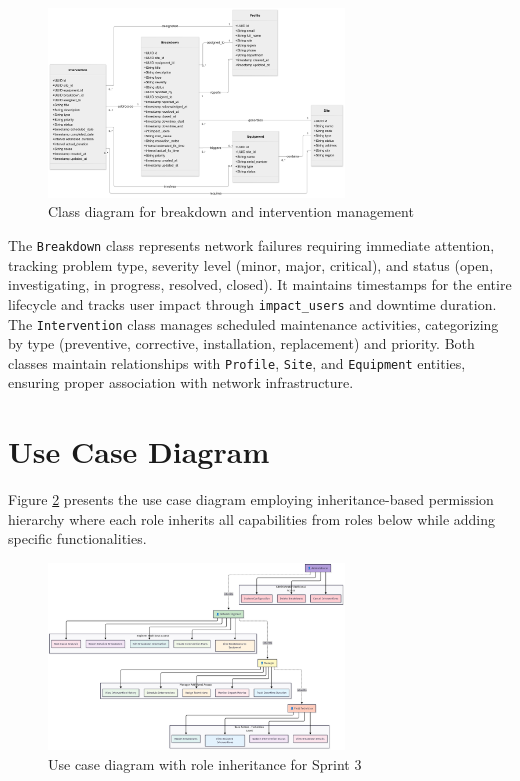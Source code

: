 \begin{figure}[H]
\centering
\includegraphics[width=0.7\textwidth]{img/chap_05/sprint3_class_diagram.png}
\caption{Class diagram for breakdown and intervention management}
\label{fig:sprint3-class}
\end{figure}

The \texttt{Breakdown} class represents network failures requiring immediate attention, tracking problem type, severity level (minor, major, critical), and status (open, investigating, in progress, resolved, closed). It maintains timestamps for the entire lifecycle and tracks user impact through \texttt{impact\_users} and downtime duration. The \texttt{Intervention} class manages scheduled maintenance activities, categorizing by type (preventive, corrective, installation, replacement) and priority. Both classes maintain relationships with \texttt{Profile}, \texttt{Site}, and \texttt{Equipment} entities, ensuring proper association with network infrastructure.

\section{Use Case Diagram}

Figure \ref{fig:sprint3-usecase} presents the use case diagram employing inheritance-based permission hierarchy where each role inherits all capabilities from roles below while adding specific functionalities.

\begin{figure}[H]
\centering
\includegraphics[width=0.7\textwidth]{img/chap_05/sprint3_usecase_diagram.png}
\caption{Use case diagram with role inheritance for Sprint 3}
\label{fig:sprint3-usecase}
\end{figure}

